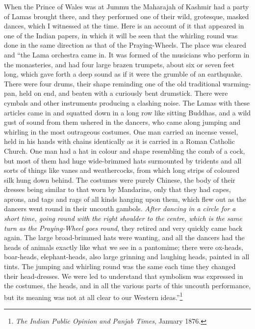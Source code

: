 \documentclass[a4paper, 11pt, oneside, polutonikogreek, english]{article}
\begin{document}
When the Prince of Wales was at Jummu the Maharajah of Kashmir had a party of Lamas brought there, and they performed one of their wild, grotesque, masked dances, which I witnessed at the time. Here is an account of it that appeared in one of the Indian papers, in which it will be seen that the whirling round was done in the same direction as that of the Praying-Wheels. The place was cleared and ``the Lama orchestra came in. It was formed of the musicians who perform in the monasteries, and had four large brazen trumpets, about six or seven feet long, which gave forth a deep sound as if it were the grumble of an earthquake. There were four drums, their shape reminding one of the old traditional warming-pan, held on end, and beaten with a curiously bent drumstick. There were cymbals and other instruments producing a clashing noise. The Lamas with these articles came in and squatted down in a long row like sitting Buddhas, and a wild gust of sound from them ushered in the dancers, who came along jumping and whirling in the most outrageous costumes. One man carried an incense vessel, held in his hands with chains identically as it is carried in a Roman Catholic Church. One man had a hat in colour and shape resembling the comb of a cock, but most of them had huge wide-brimmed hats surmounted by tridents and all sorts of things like vanes and weathercocks, from which long strips of coloured silk hung down behind. The costumes were purely Chinese, the body of their dresses being similar to that worn by Mandarins, only that they had capes, aprons, and tags and rags of all kinds hanging upon them, which flew out as the dancers went round in their uncouth gambols. \emph{After dancing in a circle for a short time, going round with the right shoulder to the centre, which is the same turn as the Praying-Wheel goes round}, they retired and very quickly came back again. The large broad-brimmed hats were wanting, and all the dancers had the heads of animals exactly like what we see in a pantomime; there were ox-heads, boar-heads, elephant-heads, also large grinning and laughing heads, painted in all tints. The jumping and whirling round was the same each time they changed their head-dresses. We were led to understand that symbolism was expressed in the costumes, the heads, and in all the various parts of this uncouth performance, but its meaning was not at all clear to our Western ideas.''\footnote{\emph{The Indian Public Opinion and Panjab Times}, January 1876.}
\end{document}
